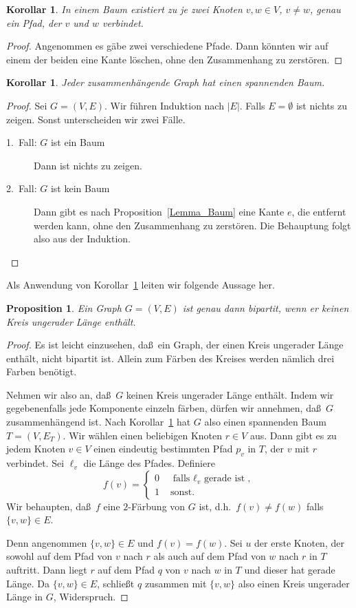 \documentclass[10pt,reqno]{amsart}
\numberwithin{equation}{section}
\newtheorem{proposition}[definition]{Proposition}
\newtheorem{corollary}[definition]{Korollar}
\newcommand\Prop{Proposition}
\newcommand\Cor{Korollar}
\begin{document}
\begin{corollary}
In einem Baum existiert zu je zwei Knoten $v,w\in V$, $v\neq w$, genau ein Pfad, der $v$ und $w$ verbindet.
\end{corollary}
\begin{proof}
Angenommen es g\"abe zwei verschiedene Pfade.
Dann k\"onnten wir auf einem der beiden eine Kante l\"oschen, ohne den Zusammenhang zu zerst\"oren.
\end{proof}

\begin{corollary}\label{Cor_spannend}
Jeder zusammenh\"angende Graph hat einen spannenden Baum.
\end{corollary}
\begin{proof}
Sei $G=(V,E)$.
Wir f\"uhren Induktion nach $|E|$.
Falls $E=\emptyset$ ist nichts zu zeigen.
Sonst unterscheiden wir zwei F\"alle.
\begin{description}
\item[1.\ Fall: $G$ ist ein Baum] Dann ist nichts zu zeigen.
\item[2.\ Fall: $G$ ist kein Baum] Dann gibt es nach \Prop~\ref{Lemma_Baum} eine Kante $e$, die entfernt werden kann,
	ohne den Zusammenhang zu zerst\"oren.
	Die Behauptung folgt also aus der Induktion.
\end{description}
\end{proof}

Als Anwendung von \Cor~\ref{Cor_spannend} leiten wir folgende Aussage her.

\begin{proposition}\label{Prop_bipartit}
Ein Graph $G=(V,E)$ ist genau dann bipartit, wenn er keinen Kreis ungerader L\"ange enth\"alt.
\end{proposition}
\begin{proof}
Es ist leicht einzusehen, da\ss\ ein Graph, der einen Kreis ungerader L\"ange enth\"alt, nicht bipartit ist.
Allein zum F\"arben des Kreises werden n\"amlich drei Farben ben\"otigt.

Nehmen wir also an, da\ss\ $G$ keinen Kreis ungerader L\"ange enth\"alt.
Indem wir gegebenenfalls jede Komponente einzeln f\"arben, d\"urfen wir annehmen, da\ss\ $G$ zusammenh\"angend ist.
Nach \Cor~\ref{Cor_spannend} hat $G$ also einen spannenden Baum $T=(V,E_T)$.
Wir w\"ahlen einen beliebigen Knoten $r\in V$ aus.
Dann gibt es zu jedem Knoten $v\in V$ einen eindeutig bestimmten Pfad $p_v$ in $T$, der $v$ mit $r$ verbindet.
Sei $\ell_v$ die L\"ange des Pfades.
Definiere
	$$f(v)=\begin{cases}
		0&\mbox{ falls $\ell_v$ gerade ist},\\
		1&\mbox{ sonst.}
		\end{cases}$$
Wir behaupten, da\ss\ $f$ eine $2$-F\"arbung von $G$ ist, d.h.\ $f(v)\neq f(w)$ falls $\{v,w\}\in E$.

Denn angenommen $\{v,w\}\in E$ und $f(v)=f(w)$.
Sei $u$ der erste Knoten, der sowohl auf dem Pfad von $v$ nach $r$ als auch auf dem Pfad von $w$ nach $r$ in $T$ auftritt.
Dann liegt $r$ auf dem Pfad $q$ von $v$ nach $w$ in $T$ und dieser hat gerade L\"ange.
Da $\{v,w\}\in E$, schlie\ss t $q$ zusammen mit $\{v,w\}$ also einen Kreis ungerader L\"ange in $G$, Widerspruch.
\end{proof}
\end{document}
